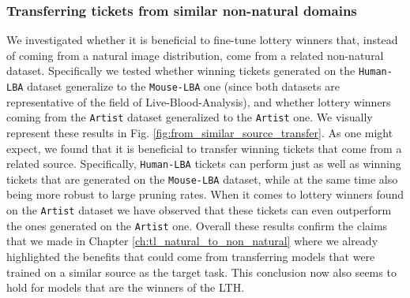 

\subsubsection{Transferring tickets from similar non-natural domains}
We investigated whether it is beneficial to fine-tune lottery winners that, instead of coming from a natural image distribution, come from a related non-natural dataset. Specifically we tested whether winning tickets generated on the \texttt{Human-LBA} dataset generalize to the \texttt{Mouse-LBA} one (since both datasets are representative of the field of Live-Blood-Analysis), and whether lottery winners coming from the \texttt{Artist}  dataset generalized to the \texttt{Artist}  one. We visually represent these results in Fig. \ref{fig:from_similar_source_transfer}. As one might expect, we found that it is beneficial to transfer winning tickets that come from a related source. Specifically, \texttt{Human-LBA} tickets can perform just as well as winning tickets that are generated on the \texttt{Mouse-LBA} dataset, while at the same time also being more robust to large pruning rates. When it comes to lottery winners found on the \texttt{Artist}  dataset we have observed that these tickets can even outperform the ones generated on the \texttt{Artist}  one. Overall these results confirm the claims that we made in Chapter \ref{ch:tl_natural_to_non_natural} where we already highlighted the benefits that could come from transferring models that were trained on a similar source as the target task. This conclusion now also seems to hold for models that are the winners of the LTH. 





